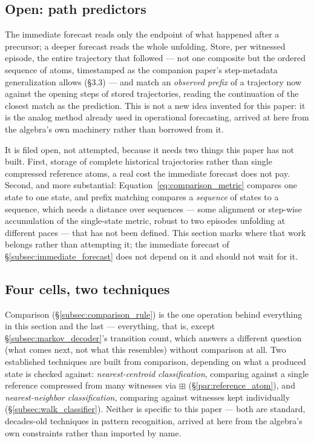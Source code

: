 \documentclass[12pt, a4paper]{article}
\begin{document}
\subsection{Open: path predictors}
\label{subsec:path_predictors}

The immediate forecast reads only the endpoint of what happened after
a precursor; a deeper forecast reads the whole unfolding. Store, per
witnessed episode, the entire trajectory that followed --- not one
composite but the ordered sequence of atoms, timestamped as the
companion paper's step-metadata generalization allows (\S3.3) --- and
match an
\emph{observed prefix} of a trajectory now against the opening steps of
stored trajectories, reading the continuation of the closest match as
the prediction. This is not a new idea invented for this paper: it is
the analog method already used in operational forecasting, arrived at
here from the algebra's own machinery rather than borrowed from it.

It is filed open, not attempted, because it needs two things this
paper has not built. First, storage of complete historical
trajectories rather than single compressed reference atoms, a real
cost the immediate forecast does not pay. Second, and more
substantial: Equation~\eqref{eq:comparison_metric} compares one state
to one state, and prefix matching compares a \emph{sequence} of states
to a sequence, which needs a distance over sequences --- some
alignment or step-wise accumulation of the single-state metric,
robust to two episodes unfolding at different paces --- that has not
been defined. This section marks where that work belongs rather than
attempting it; the immediate forecast of
\S\ref{subsec:immediate_forecast} does not depend on it and should not
wait for it.

\subsection{Four cells, two techniques}
\label{subsec:four_cells}

Comparison (\S\ref{subsec:comparison_rule}) is the one operation
behind everything in this section and the last --- everything, that
is, except \S\ref{subsec:markov_decoder}'s transition count, which
answers a different question (what comes next, not what this
resembles) without comparison at all. Two established
techniques are built from comparison, depending on what a produced
state is checked against: \emph{nearest-centroid classification},
comparing against a single reference compressed from many witnesses
via $\boxplus$ (\S\ref{par:reference_atom}), and
\emph{nearest-neighbor classification}, comparing against witnesses
kept individually (\S\ref{subsec:walk_classifier}). Neither is
specific to this paper --- both are standard, decades-old techniques
in pattern recognition, arrived at here from the algebra's own
constraints rather than imported by name.
\end{document}
